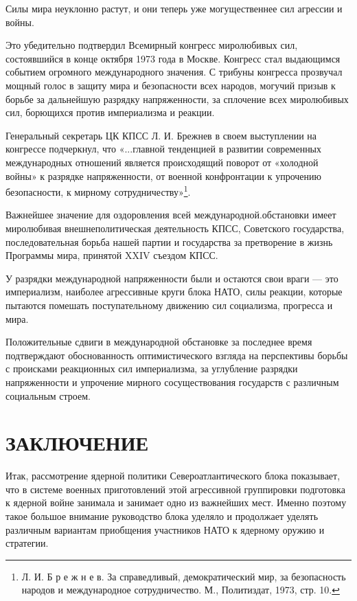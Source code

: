 \documentclass[12pt, a4paper, openany]{book}
\begin{document}
	Силы мира неуклонно растут, и они теперь уже могущественнее сил агрессии и войны.
	
	Это убедительно подтвердил Всемирный конгресс миролюбивых сил, состоявшийся в конце октября 1973 года в Москве. Конгресс стал выдающимся событием огромного международного значения. С трибуны конгресса прозвучал мощный голос в защиту мира и безопасности всех народов, могучий призыв к борьбе за дальнейшую разрядку напряженности, за сплочение всех миролюбивых сил, борющихся против империализма и реакции.
	
	Генеральный секретарь ЦК КПСС Л. И. Брежнев в своем выступлении на конгрессе подчеркнул, что «...главной тенденцией в развитии современных международных отношений является происходящий поворот от «холодной войны» к разрядке напряженности, от военной конфронтации к упрочению безопасности, к мирному сотрудничеству»{\footnote{Л. И. Б р е ж н е в. За справедливый, демократический мир, за безопасность народов и международное сотрудничество. М., Политиздат, 1973, стр. 10.}}.
	
	Важнейшее значение для оздоровления всей международной.обстановки имеет миролюбивая внешнеполитическая деятельность КПСС, Советского государства, последовательная борьба нашей партии и государства за претворение в жизнь Программы мира, принятой XXIV съездом КПСС.
	
	У разрядки международной напряженности были и остаются свои враги — это империализм, наиболее агрессивные круги блока НАТО, силы реакции, которые пытаются помешать поступательному движению сил социализма, прогресса и мира.
	
	Положительные сдвиги в международной обстановке за последнее время подтверждают обоснованность оптимистического взгляда на перспективы борьбы с происками реакционных сил империализма, за углубление разрядки напряженности и упрочение мирного сосуществования государств с различным социальным строем.
	
		\newpage
	\section[Заключение]{\center \textbf{ЗАКЛЮЧЕНИЕ}}	
	
	
	Итак, рассмотрение ядерной политики Североатлантического блока показывает, что в системе военных приготовлений этой агрессивной группировки подготовка к ядерной войне занимала и занимает одно из важнейших мест. Именно поэтому такое большое внимание руководство блока уделяло и продолжает уделять различным вариантам приобщения участников НАТО к ядерному оружию и стратегии.
	
\end{document}
